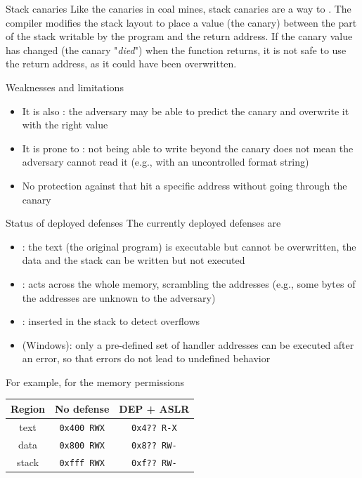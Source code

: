\begin{parag}{Stack canaries}
    Like the canaries in coal mines, stack canaries are a way to . The compiler modifies the stack layout to place a value (the canary) between the part of the stack writable by the program and the return address. If the canary value has changed (the canary "\textit{died}") when the function returns, it is not safe to use the return address, as it could have been overwritten.
    \begin{subparag}{Weaknesses and limitations}
        \begin{itemize}
            \item It is also : the adversary may be able to predict the canary and overwrite it with the right value
            \item It is prone to : not being able to write beyond the canary does not mean the adversary cannot read it (e.g., with an uncontrolled format string)
            \item No protection against  that hit a specific address without going through the canary
        \end{itemize}
    \end{subparag}
\end{parag}

\begin{parag}{Status of deployed defenses}
    The currently deployed defenses are
    \begin{itemize}
        \item {}: the text (the original program) is executable but cannot be overwritten, the data and the stack can be written but not executed
        \item {}: acts across the whole memory, scrambling the addresses (e.g., some bytes of the addresses are unknown to the adversary)
        \item {}: inserted in the stack to detect overflows
        \item {} (Windows): only a pre-defined set of handler addresses can be executed after an error, so that errors do not lead to undefined behavior
    \end{itemize}
    For example, for the memory permissions
    \begin{center}
        \begin{tabular}{|c|c|c|}
            \hline
            \textbf{Region} & \textbf{No defense} & \textbf{DEP + ASLR} \\
            \hline
            text & \texttt{0x400 RWX} & \texttt{0x4?? R-X} \\
            \hline
            data & \texttt{0x800 RWX} & \texttt{0x8?? RW-} \\
            \hline
            stack & \texttt{0xfff RWX} & \texttt{0xf?? RW-} \\
            \hline
        \end{tabular}
    \end{center}
\end{parag}

